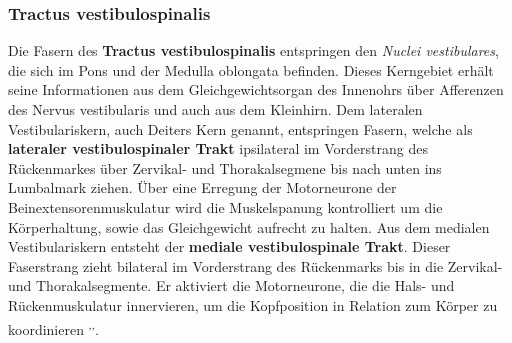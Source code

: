 \documentclass[12pt,a4paper,pdftex]{article}
\begin{document}
\subsubsection{Tractus vestibulospinalis}  \label{subsubsec:vestibulospinalis}
Die Fasern des \textbf{Tractus vestibulospinalis} entspringen den \textit{Nuclei vestibulares}, die sich im Pons und der Medulla oblongata befinden. Dieses Kerngebiet erhält seine Informationen aus dem Gleichgewichtsorgan des Innenohrs über Afferenzen des Nervus vestibularis und auch aus dem Kleinhirn. Dem lateralen Vestibulariskern, auch Deiters Kern genannt, entspringen Fasern, welche als \textbf{lateraler vestibulospinaler Trakt} ipsilateral im Vorderstrang des Rückenmarkes über Zervikal- und Thorakalsegmene bis nach unten ins Lumbalmark ziehen. Über eine Erregung der Motorneurone der Beinextensorenmuskulatur wird die Muskelspanung kontrolliert um die Körperhaltung, sowie das Gleichgewicht aufrecht zu halten. Aus dem medialen Vestibulariskern entsteht der \textbf{mediale vestibulospinale Trakt}. Dieser Faserstrang zieht bilateral im Vorderstrang des Rückenmarks bis in die Zervikal- und Thorakalsegmente. Er aktiviert die Motorneurone, die die Hals- und Rückenmuskulatur innervieren, um die Kopfposition in Relation zum Körper zu koordinieren \textsuperscript{\cite[14]{neurowissenschaften_baer},\cite[9]{crossman2014neuroanatomy},\cite[8]{paxinos2014rat}}.  
\end{document}
